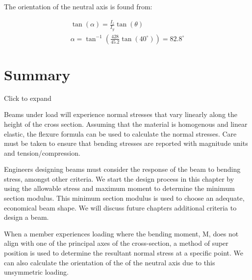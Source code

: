 \documentclass[
  letterpaper,
  DIV=11,
  numbers=noendperiod]{scrreprt}
\begin{document}
\begin{tcolorbox}
The orientation of the neutral axis is found from:

\[
\begin{gathered}
\tan (\alpha)=\frac{I_z}{I_y} \tan (\theta) \\
\alpha=\tan ^{-1}\left(\frac{428}{45.2} \tan \left(40^{\circ}\right)\right)=82.8^{\circ}
\end{gathered}
\]

\end{tcolorbox}

\section{Summary}\label{summary-4}

Click to expand

\begin{tcolorbox}[enhanced jigsaw, colbacktitle=quarto-callout-note-color!10!white, title={Key takeaways}, coltitle=black, leftrule=.75mm, rightrule=.15mm, opacityback=0, breakable, colframe=quarto-callout-note-color-frame, left=2mm, arc=.35mm, colback=white, bottomrule=.15mm, bottomtitle=1mm, toptitle=1mm, titlerule=0mm, opacitybacktitle=0.6, toprule=.15mm]

Beams under load will experience normal stresses that vary linearly
along the height of the cross section. Assuming that the material is
homogenous and linear elastic, the flexure formula can be used to
calculate the normal stresses. Care must be taken to ensure that bending
stresses are reported with magnitude units and tension/compression.

Engineers designing beams must consider the response of the beam to
bending stress, amongst other criteria. We start the design process in
this chapter by using the allowable stress and maximum moment to
determine the minimum section modulus. This minimum section modulus is
used to choose an adequate, economical beam shape. We will discuss
future chapters additional criteria to design a beam.

When a member experiences loading where the bending moment, M, does not
align with one of the principal axes of the cross-section, a method of
super position is used to determine the resultant normal stress at a
specific point. We can also calculate the orientation of the of the
neutral axis due to this unsymmetric loading.

\end{tcolorbox}
\end{document}
